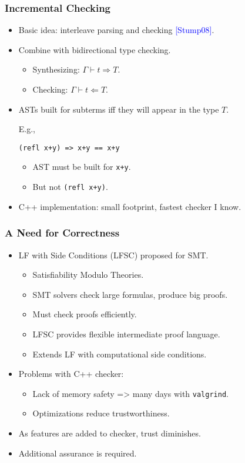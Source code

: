 \documentclass[11pt]{beamer}
\begin{document}
\begin{frame}[containsverbatim]
\frametitle{Incremental Checking}
\begin{itemize}
\item Basic idea: interleave parsing and checking \textcolor{blue}{[Stump08]}.
\item Combine with bidirectional type checking.
\begin{itemize}
\item Synthesizing: $\Gamma \vdash t \Rightarrow T$.
\item Checking: $\Gamma \vdash t \Leftarrow T$.
\end{itemize}
\item ASTs built for subterms iff they will appear in the type $T$.

E.g., 

\begin{verbatim}
(refl x+y) => x+y == x+y
\end{verbatim}

\begin{itemize}
\item AST must be built for \texttt{x+y}.
\item But not \texttt{(refl x+y)}.
\end{itemize}

\item C++ implementation: small footprint, fastest checker I know.

\end{itemize}
\end{frame}

\begin{frame}
\frametitle{A Need for Correctness}

\begin{itemize}
\item LF with Side Conditions (LFSC) proposed for SMT.
\begin{itemize}
\item Satisfiability Modulo Theories.
\item SMT solvers check large formulas, produce big proofs.
\item Must check proofs efficiently.
\item LFSC provides flexible intermediate proof language.
\item Extends LF with computational side conditions. 
\end{itemize}
\item Problems with C++ checker:
\begin{itemize}
\item Lack of memory safety => many days with \texttt{valgrind}.
\item Optimizations reduce trustworthiness.
\end{itemize}
\item As features are added to checker, trust diminishes.
\item Additional assurance is required.
\end{itemize}
\end{frame}
\end{document}
